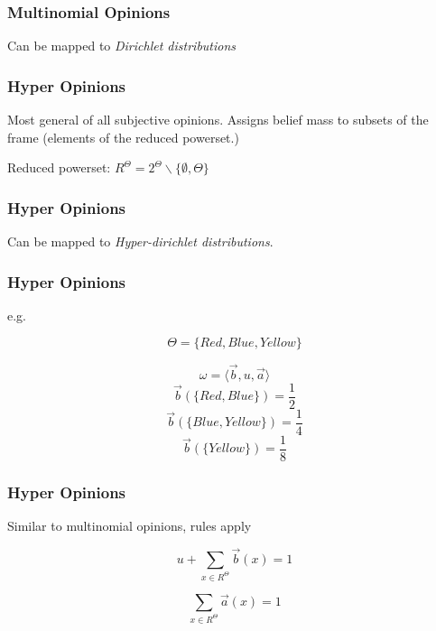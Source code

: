 \documentclass{beamer}
\begin{document}

\begin{frame}
\frametitle{Multinomial Opinions}

Can be mapped to \emph{Dirichlet distributions}

\end{frame}


\begin{frame}
\frametitle{Hyper Opinions}

Most general of all subjective opinions. Assigns belief mass to subsets of the
frame (elements of the reduced powerset.)

Reduced powerset: $R^\Theta = 2^\Theta \backslash \lbrace \emptyset, \Theta \rbrace$

\end{frame}


\begin{frame}
\frametitle{Hyper Opinions}

Can be mapped to \emph{Hyper-dirichlet distributions}.

\end{frame}


\begin{frame}
\frametitle{Hyper Opinions}

e.g.

$$\Theta = \lbrace Red, Blue, Yellow \rbrace$$

$$\omega = \langle \vec{b}, u, \vec{a} \rangle$$
$$\vec{b}\left(\lbrace Red, Blue \rbrace \right) = \frac{1}{2}$$
$$\vec{b}\left(\lbrace Blue, Yellow \rbrace \right) = \frac{1}{4}$$
$$\vec{b}\left(\lbrace Yellow \rbrace \right) = \frac{1}{8}$$

\end{frame}


\begin{frame}
\frametitle{Hyper Opinions}

Similar to multinomial opinions, rules apply

$$u + \sum_{x \in R^\Theta} \vec{b}\left(x\right) = 1$$

$$\sum_{x \in R^\Theta} \vec{a}\left(x\right) = 1$$

\end{frame}
\end{document}
